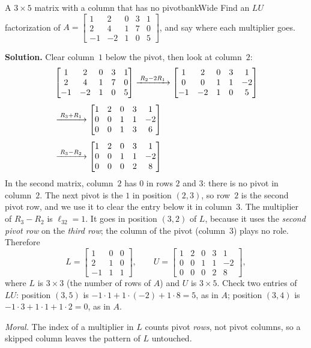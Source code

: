 \documentclass[11pt]{article}
\begin{document}
\begin{exmp}{A $3\times5$ matrix with a column that has no pivot}{bankWide}
Find an $LU$ factorization of $A=\begin{bmatrix}1&2&0&3&1\\2&4&1&7&0\\-1&-2&1&0&5\end{bmatrix}$, and say where each multiplier goes.

\textbf{Solution.} Clear column~$1$ below the pivot, then look at column~$2$:
\begin{align*}
&\begin{bmatrix}1&2&0&3&1\\2&4&1&7&0\\-1&-2&1&0&5\end{bmatrix}
\xrightarrow{\;R_2-2R_1\;}
\begin{bmatrix}1&2&0&3&1\\0&0&1&1&-2\\-1&-2&1&0&5\end{bmatrix}\\[4pt]
&\xrightarrow{\;R_3+R_1\;}
\begin{bmatrix}1&2&0&3&1\\0&0&1&1&-2\\0&0&1&3&6\end{bmatrix}\\[4pt]
&\xrightarrow{\;R_3-R_2\;}
\begin{bmatrix}1&2&0&3&1\\0&0&1&1&-2\\0&0&0&2&8\end{bmatrix}
\end{align*}
In the second matrix, column~$2$ has $0$ in rows $2$ and $3$: there is no pivot in column~$2$. The next pivot is the $1$ in position $(2,3)$, so row~$2$ is the second pivot row, and we use it to clear the entry below it in column~$3$. The multiplier of $R_3-R_2$ is $\ell_{32}=1$. It goes in position $(3,2)$ of $L$, because it uses the \emph{second pivot row} on the \emph{third row}; the column of the pivot (column~$3$) plays no role. Therefore
\[
L=\begin{bmatrix}1&0&0\\2&1&0\\-1&1&1\end{bmatrix},\qquad U=\begin{bmatrix}1&2&0&3&1\\0&0&1&1&-2\\0&0&0&2&8\end{bmatrix},
\]
where $L$ is $3\times3$ (the number of rows of $A$) and $U$ is $3\times5$. Check two entries of $LU$: position $(3,5)$ is $-1\cdot1+1\cdot(-2)+1\cdot8=5$, as in $A$; position $(3,4)$ is $-1\cdot3+1\cdot1+1\cdot2=0$, as in $A$.

\emph{Moral.} The index of a multiplier in $L$ counts pivot \emph{rows}, not pivot columns, so a skipped column leaves the pattern of $L$ untouched.
\end{exmp}
\end{document}
